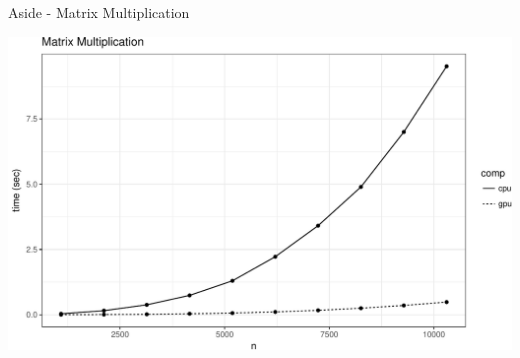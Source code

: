 \documentclass[11pt,ignorenonframetext,]{beamer}
\begin{document}
\begin{frame}{Aside - Matrix Multiplication}

\includegraphics{Lec22_files/figure-beamer/unnamed-chunk-5-1.pdf}

\end{frame}
\end{document}

